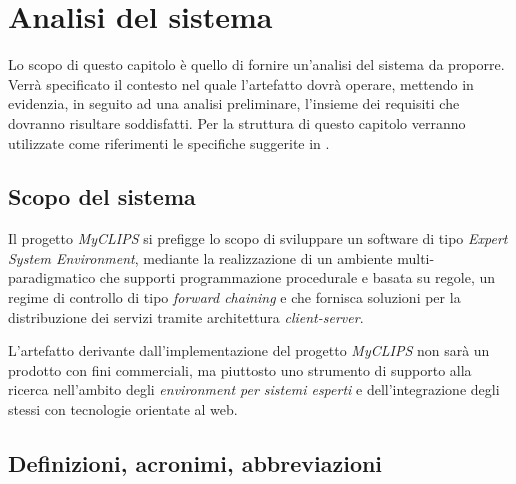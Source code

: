 
\chapter{Analisi del sistema}

Lo scopo di questo capitolo è quello di fornire un'analisi del sistema da proporre. Verrà specificato il contesto nel quale l'artefatto dovrà operare, mettendo in evidenzia, in seguito ad una analisi preliminare, l'insieme dei requisiti che dovranno risultare soddisfatti. Per la struttura di questo capitolo verranno utilizzate come riferimenti le specifiche suggerite in \cite{ieee830-1998}.

\section{Scopo del sistema}

Il progetto \emph{MyCLIPS} si prefigge lo scopo di sviluppare un software di tipo \emph{Expert System Environment}, mediante la realizzazione di un ambiente multi-paradigmatico che supporti programmazione procedurale e basata su regole, un regime di controllo di tipo \emph{forward chaining} e che fornisca soluzioni per la distribuzione dei servizi tramite architettura \emph{client-server}.

L'artefatto derivante dall'implementazione del progetto \emph{MyCLIPS} non sarà un prodotto con fini commerciali, ma piuttosto uno strumento di supporto alla ricerca nell'ambito degli \emph{environment per sistemi esperti} e dell'integrazione degli stessi con tecnologie orientate al web.


\section{Definizioni, acronimi, abbreviazioni}

